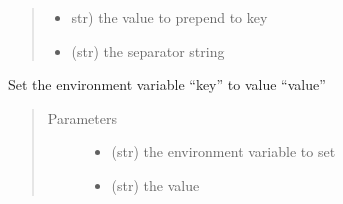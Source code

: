 \documentclass[a4paper,10pt,english]{sphinxmanual}
\begin{document}
\begin{fulllineitems}
\begin{fulllineitems}
\begin{quote}
\begin{description}
\begin{itemize}
\item {} 
 \textendash{} str) the value to prepend to key

\item {} 
 \textendash{} (str) the separator string

\end{itemize}

\end{description}\end{quote}

\end{fulllineitems}


\begin{fulllineitems}
\label{\detokenize{apidoc_src/src:src.fileEnviron.FileEnviron.set}}
Set the environment variable “key” to value “value”
\begin{quote}\begin{description}
\item[{Parameters}] \leavevmode\begin{itemize}
\item {} 
 \textendash{} (str) the environment variable to set

\item {} 
 \textendash{} (str) the value

\end{itemize}

\end{description}\end{quote}

\end{fulllineitems}


\end{fulllineitems}

\end{document}
